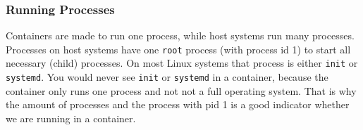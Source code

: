 \subsubsection{Running Processes}
Containers are made to run one process, while host systems run many processes. Processes on host systems have one \lstinline{root} process (with process id 1) to start all necessary (child) processes. On most Linux systems that process is either \lstinline{init} or \lstinline{systemd}. You would never see \lstinline{init} or \lstinline{systemd} in a container, because the container only runs one process and not not a full operating system. That is why the amount of processes and the process with pid 1 is a good indicator whether we are running in a container.
